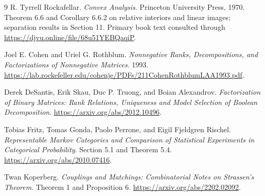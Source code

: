 \documentclass[11pt]{article}
\theoremstyle{remark}
\begin{document}
\begin{thebibliography}{9}
R. Tyrrell Rockafellar.
\emph{Convex Analysis}. Princeton University Press, 1970.
Theorem 6.6 and Corollary 6.6.2 on relative interiors and linear images; separation results in Section 11.
Primary book text consulted through \url{https://djvu.online/file/68u51YEBQaqiP}.

Joel E. Cohen and Uriel G. Rothblum.
\emph{Nonnegative Ranks, Decompositions, and Factorizations of Nonnegative Matrices}. 1993.
\url{https://lab.rockefeller.edu/cohenje/PDFs/211CohenRothblumLAA1993.pdf}.

Derek DeSantis, Erik Skau, Duc P. Truong, and Boian Alexandrov.
\emph{Factorization of Binary Matrices: Rank Relations, Uniqueness and Model Selection of Boolean Decomposition}.
\url{https://arxiv.org/abs/2012.10496}.

Tobias Fritz, Tomas Gonda, Paolo Perrone, and Eigil Fjeldgren Rischel.
\emph{Representable Markov Categories and Comparison of Statistical Experiments in Categorical Probability}.
Section 5.1 and Theorem 5.4.
\url{https://arxiv.org/abs/2010.07416}.

Twan Koperberg.
\emph{Couplings and Matchings: Combinatorial Notes on Strassen's Theorem}.
Theorem 1 and Proposition 6.
\url{https://arxiv.org/abs/2202.02092}.
\end{thebibliography}
\end{document}
